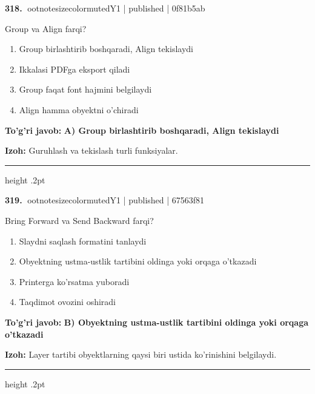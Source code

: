 \documentclass[10pt,a4paper]{article}
\begin{document}
\textbf{\color{ink}318.} {ootnotesizecolor{muted}Y1 | published | 0f81b5ab}
\par
Group va Align farqi?
\begin{enumerate}[label=\Alph*),leftmargin=9mm]
\item Group birlashtirib boshqaradi, Align tekislaydi
\item Ikkalasi PDFga eksport qiladi
\item Group faqat font hajmini belgilaydi
\item Align hamma obyektni o'chiradi
\end{enumerate}
\begin{tcolorbox}[enhanced,breakable,colback=teal!4,colframe=teal!55!black,boxrule=0.45pt,arc=1.2mm,left=2.8mm,right=2.8mm,top=2mm,bottom=2mm]
\textbf{\color{teal}To'g'ri javob:} \textbf{A) Group birlashtirib boshqaradi, Align tekislaydi}
\par\smallskip
\textbf{Izoh:} Guruhlash va tekislash turli funksiyalar.
\end{tcolorbox}
\vspace{2mm}\hrule height .2pt\vspace{2mm}

\textbf{\color{ink}319.} {ootnotesizecolor{muted}Y1 | published | 67563f81}
\par
Bring Forward va Send Backward farqi?
\begin{enumerate}[label=\Alph*),leftmargin=9mm]
\item Slaydni saqlash formatini tanlaydi
\item Obyektning ustma-ustlik tartibini oldinga yoki orqaga o'tkazadi
\item Printerga ko'rsatma yuboradi
\item Taqdimot ovozini oshiradi
\end{enumerate}
\begin{tcolorbox}[enhanced,breakable,colback=teal!4,colframe=teal!55!black,boxrule=0.45pt,arc=1.2mm,left=2.8mm,right=2.8mm,top=2mm,bottom=2mm]
\textbf{\color{teal}To'g'ri javob:} \textbf{B) Obyektning ustma-ustlik tartibini oldinga yoki orqaga o'tkazadi}
\par\smallskip
\textbf{Izoh:} Layer tartibi obyektlarning qaysi biri ustida ko'rinishini belgilaydi.
\end{tcolorbox}
\vspace{2mm}\hrule height .2pt\vspace{2mm}
\end{document}
